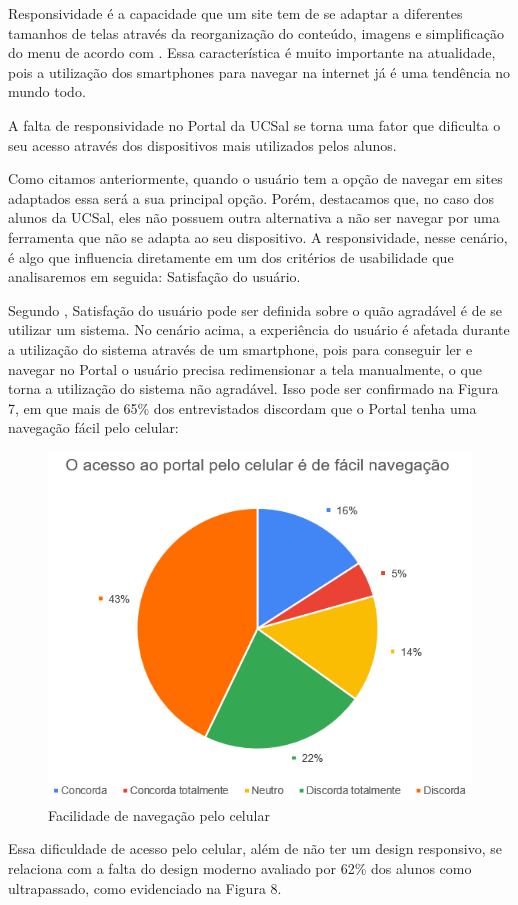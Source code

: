 \documentclass[12pt]{article}
\begin{document}
Responsividade é a capacidade que um site tem de se adaptar a diferentes tamanhos de telas através da reorganização do conteúdo, imagens e simplificação do menu de acordo com . Essa característica é muito importante na atualidade, pois a utilização dos smartphones para navegar na internet já é uma tendência no mundo todo. 

A falta de responsividade no Portal da UCSal se torna uma fator que dificulta o seu acesso através dos dispositivos mais utilizados pelos alunos. 

Como citamos anteriormente, quando o usuário tem a opção de navegar em sites adaptados essa será a sua principal opção. Porém, destacamos que, no caso dos alunos da UCSal, eles não possuem outra alternativa a não ser navegar por uma ferramenta que não se adapta ao seu dispositivo.  A responsividade, nesse cenário, é algo que influencia diretamente em um dos critérios de usabilidade que analisaremos em seguida: Satisfação do usuário.

Segundo , Satisfação do usuário pode ser definida sobre o quão agradável é de se utilizar um sistema. No cenário acima, a experiência do usuário é afetada durante a utilização do sistema através de um smartphone, pois para conseguir ler e navegar no Portal o usuário precisa redimensionar a tela manualmente, o que torna a utilização do sistema não agradável. Isso pode ser confirmado na Figura 7,  em que mais de 65\% dos entrevistados discordam que o Portal tenha uma navegação fácil pelo celular:

\begin{figure}[!htb]
\centering
\includegraphics[scale=0.4,frame]{img7.png}
\caption{Facilidade de navegação pelo celular}
\label{fig:grafico4}
\end{figure}
\FloatBarrier
Essa dificuldade de acesso pelo celular, além de não ter um design responsivo, se relaciona com a falta do design moderno avaliado por 62\% dos alunos como ultrapassado, como evidenciado na Figura 8.
\end{document}
